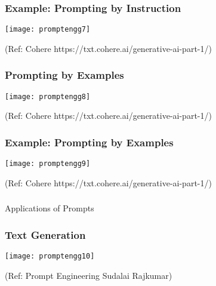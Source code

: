 \begin{frame}[fragile]\frametitle{Example: Prompting by Instruction}

\begin{center}
\texttt{[image: promptengg7]}

{\tiny (Ref: Cohere https://txt.cohere.ai/generative-ai-part-1/)}

\end{center}		
		


\end{frame}

\begin{frame}[fragile]\frametitle{Prompting by Examples}

\begin{center}
\texttt{[image: promptengg8]}

{\tiny (Ref: Cohere https://txt.cohere.ai/generative-ai-part-1/)}

\end{center}		
		


\end{frame}

\begin{frame}[fragile]\frametitle{Example: Prompting by Examples}

\begin{center}
\texttt{[image: promptengg9]}

{\tiny (Ref: Cohere https://txt.cohere.ai/generative-ai-part-1/)}

\end{center}		
		
\end{frame}

\begin{frame}[fragile]\frametitle{}
\begin{center}
{\Large Applications of Prompts}
\end{center}
\end{frame}

\begin{frame}[fragile]\frametitle{Text Generation}

\begin{center}
\texttt{[image: promptengg10]}

{\tiny (Ref: Prompt Engineering Sudalai Rajkumar)}

\end{center}		
		


\end{frame}

